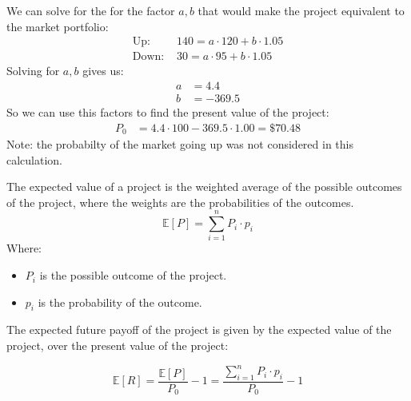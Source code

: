 \begin{example}
\begin{figure}[h!]
    \end{figure}
    We can solve for the for the factor $a, b$ that would make the project equivalent to the market portfolio:
    \begin{align*}
        \text{Up: }   & 140 = a \cdot 120 + b \cdot 1.05 \\
        \text{Down: } & 30 = a \cdot 95 + b \cdot 1.05
    \end{align*}
    Solving for $a, b$ gives us:
    \begin{align*}
        a & = 4.4    \\
        b & = -369.5
    \end{align*}
    So we can use this factors to find the present value of the project:
    \begin{align*}
        P_0 & = 4.4 \cdot 100 - 369.5 \cdot 1.00 = \$ 70.48
    \end{align*}
    Note: the probabilty of the market going up was not considered in this calculation.\\

\end{example}

\begin{definition}
    The expected value of a project is the weighted average of the possible outcomes of the project, where the weights are the probabilities of the outcomes.\\
    \begin{equation}
        \mathbb{E}[P] = \sum_{i=1}^{n} P_i \cdot p_i
    \end{equation}
    Where:
    \begin{itemize}
        \item $P_i$ is the possible outcome of the project.
        \item $p_i$ is the probability of the outcome.
    \end{itemize}
\end{definition}

\begin{definition}

    The expected future payoff of the project is given by the expected value of the project, over the present value of the project:

    \begin{equation}
        \mathbb{E}[R] = \frac{\mathbb{E}[P]}{P_0} -1 = \frac{\sum_{i=1}^{n} P_i \cdot p_i}{P_0} -1
    \end{equation}

\end{definition}

